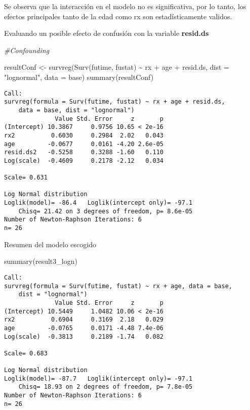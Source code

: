 \documentclass[
]{article}
\newenvironment{Shaded}{\begin{snugshade}}{\end{snugshade}}
\newcommand{\AttributeTok}[1]{\textcolor[rgb]{0.77,0.63,0.00}{#1}}
\newcommand{\CommentTok}[1]{\textcolor[rgb]{0.56,0.35,0.01}{\textit{#1}}}
\newcommand{\FunctionTok}[1]{\textcolor[rgb]{0.00,0.00,0.00}{#1}}
\newcommand{\NormalTok}[1]{#1}
\newcommand{\OtherTok}[1]{\textcolor[rgb]{0.56,0.35,0.01}{#1}}
\newcommand{\SpecialCharTok}[1]{\textcolor[rgb]{0.00,0.00,0.00}{#1}}
\newcommand{\StringTok}[1]{\textcolor[rgb]{0.31,0.60,0.02}{#1}}
\begin{document}
Se observa que la interacción en el modelo no es significativa, por lo
tanto, los efectos principales tanto de la edad como rx son
estadísticamente validos.

Evaluando un posible efecto de confusión con la variable
\textbf{resid.ds}

\begin{Shaded}
\begin{Highlighting}[]
\CommentTok{\#Confounding}

\NormalTok{resultConf }\OtherTok{\textless{}{-}} \FunctionTok{survreg}\NormalTok{(}\FunctionTok{Surv}\NormalTok{(futime, fustat) }\SpecialCharTok{\textasciitilde{}}\NormalTok{ rx }\SpecialCharTok{+}\NormalTok{ age }\SpecialCharTok{+}\NormalTok{ resid.ds, }\AttributeTok{dist =} \StringTok{"lognormal"}\NormalTok{, }\AttributeTok{data =}\NormalTok{ base)}
\FunctionTok{summary}\NormalTok{(resultConf)}
\end{Highlighting}
\end{Shaded}

\begin{verbatim}
Call:
survreg(formula = Surv(futime, fustat) ~ rx + age + resid.ds, 
    data = base, dist = "lognormal")
              Value Std. Error     z       p
(Intercept) 10.3867     0.9756 10.65 < 2e-16
rx2          0.6030     0.2984  2.02   0.043
age         -0.0677     0.0161 -4.20 2.6e-05
resid.ds2   -0.5258     0.3288 -1.60   0.110
Log(scale)  -0.4609     0.2178 -2.12   0.034

Scale= 0.631 

Log Normal distribution
Loglik(model)= -86.4   Loglik(intercept only)= -97.1
    Chisq= 21.42 on 3 degrees of freedom, p= 8.6e-05 
Number of Newton-Raphson Iterations: 6 
n= 26 
\end{verbatim}

Resumen del modelo escogido

\begin{Shaded}
\begin{Highlighting}[]
\FunctionTok{summary}\NormalTok{(result3\_logn)}
\end{Highlighting}
\end{Shaded}

\begin{verbatim}
Call:
survreg(formula = Surv(futime, fustat) ~ rx + age, data = base, 
    dist = "lognormal")
              Value Std. Error     z       p
(Intercept) 10.5449     1.0482 10.06 < 2e-16
rx2          0.6904     0.3169  2.18   0.029
age         -0.0765     0.0171 -4.48 7.4e-06
Log(scale)  -0.3813     0.2189 -1.74   0.082

Scale= 0.683 

Log Normal distribution
Loglik(model)= -87.7   Loglik(intercept only)= -97.1
    Chisq= 18.93 on 2 degrees of freedom, p= 7.8e-05 
Number of Newton-Raphson Iterations: 6 
n= 26 
\end{verbatim}
\end{document}
